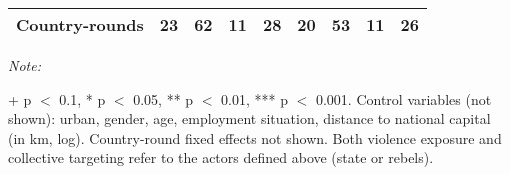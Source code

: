 \begin{table}[!h]
{\begin{threeparttable}
\begin{tabular}[t]{lcccccccc}
Country-rounds & 23 & 62 & 11 & 28 & 20 & 53 & 11 & 26\\
\bottomrule
\end{tabular}
\begin{tablenotes}[para]
\item \textit{Note: } 
\item + p $<$ 0.1, * p $<$ 0.05, ** p $<$ 0.01, *** p $<$ 0.001. Control variables (not shown): urban, gender, age, employment situation, distance to national capital (in km, log). Country-round fixed effects not shown. Both violence exposure and collective targeting refer to the actors defined above (state or rebels).
\end{tablenotes}
\end{threeparttable}}
\end{table}
